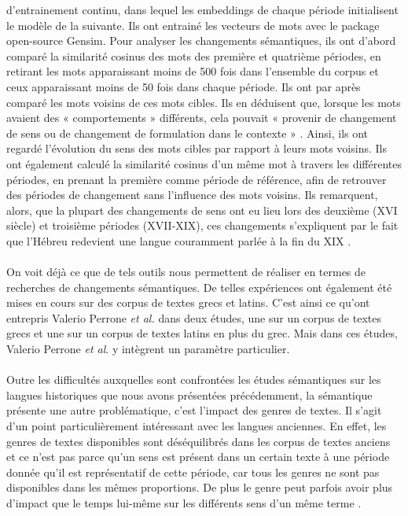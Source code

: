 \documentclass{article}
\begin{document}
d’entrainement continu, dans lequel les embeddings de chaque période initialisent le modèle de la suivante. Ils ont entrainé les vecteurs de mots avec le package open-source Gensim. Pour analyser les changements sémantiques, ils ont d’abord comparé la similarité cosinus des mots des première et quatrième périodes, en retirant les mots apparaissant moins de 500 fois dans l’ensemble du corpus et ceux apparaissant moins de 50 fois dans chaque période. Ils ont par après comparé les mots voisins de ces mots cibles. Ils en déduisent que, lorsque les mots avaient des « comportements » différents, cela pouvait « provenir de changement de sens ou de changement de formulation dans le contexte » \cite{liebeskind2020deep}. Ainsi, ils ont regardé l’évolution du sens des mots cibles par rapport à leurs mots voisins. Ils ont également calculé la similarité cosinus d’un même mot à travers les différentes périodes, en prenant la première comme période de référence, afin de retrouver des périodes de changement sans l’influence des mots voisins. Ils remarquent, alors, que la plupart des changements de sens ont eu lieu lors des deuxième (XVI siècle) et troisième périodes (XVII-XIX), ces changements s’expliquent par le fait que l’Hébreu redevient une langue couramment parlée à la fin du XIX \cite{liebeskind2020deep}. 
\paragraph{}
On voit déjà ce que de tels outils nous permettent de réaliser en termes de recherches de changements sémantiques. De telles expériences ont également été mises en cours sur des corpus de textes grecs et latins. C’est ainsi ce qu’ont entrepris Valerio Perrone \textit{et al.} dans deux études, une sur un corpus de textes grecs et une sur un corpus de textes latins en plus du grec. Mais dans ces études, Valerio Perrone \textit{et al}. y intègrent un paramètre particulier. 
\paragraph{}
Outre les difficultés auxquelles sont confrontées les études sémantiques sur les langues historiques que nous avons présentées précédemment, la sémantique présente une autre problématique, c’est l’impact des genres de textes. Il s’agit d’un point particulièrement intéressant avec les langues anciennes. En effet, les genres de textes disponibles sont déséquilibrés dans les corpus de textes anciens \cite{perrone2019gasc} et ce n’est pas parce qu’un sens est présent dans un certain texte à une période donnée qu’il est représentatif de cette période, car tous les genres ne sont pas disponibles dans les mêmes proportions. De plus le genre peut parfois avoir plus d’impact que le temps lui-même sur les différents sens d’un même terme \cite{perrone2019gasc}. 
\end{document}
